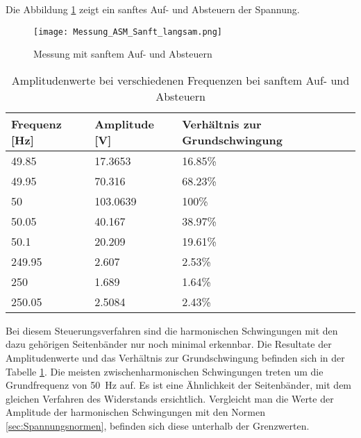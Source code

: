 Die Abbildung \ref{fig:Mess_ASM_Sanft_langsam} zeigt ein sanftes Auf- und Absteuern der Spannung.

\begin{figure}[ht!]
	\centering
	\texttt{[image: Messung\_ASM\_Sanft\_langsam.png]}	
	\caption{Messung mit sanftem Auf- und Absteuern}\label{fig:Mess_ASM_Sanft_langsam}
\end{figure}


\begin{table}[ht!]
	\centering
	\begin{tabular}{|l|l|l|}
		\hline
		Frequenz {[}Hz{]} & Amplitude {[}V{]} & Verhältnis zur Grundschwingung \\ \hline
		49.85             & 17.3653           & 16.85\%                        \\ \hline
		49.95             & 70.316            & 68.23\%                        \\ \hline
		50                & 103.0639          & 100\%                          \\ \hline
		50.05             & 40.167            & 38.97\%                        \\ \hline
		50.1              & 20.209            & 19.61\%                        \\ \hline
		249.95            & 2.607             & 2.53\%                         \\ \hline
		250               & 1.689             & 1.64\%                         \\ \hline
		250.05            & 2.5084            & 2.43\%                         \\ \hline
	\end{tabular}
\caption{Amplitudenwerte bei verschiedenen Frequenzen bei sanftem Auf- und Absteuern}\label{tab:Mess_Spannung_ASM_AufAb_sanft}
\end{table}


Bei diesem Steuerungsverfahren sind die harmonischen Schwingungen mit den dazu gehörigen Seitenbänder nur noch minimal erkennbar. Die Resultate der Amplitudenwerte und das Verhältnis zur Grundschwingung befinden sich in der Tabelle \ref{tab:Mess_Spannung_ASM_AufAb_sanft}. Die meisten zwischenharmonischen Schwingungen treten um die Grundfrequenz von \SI{50}{Hz} auf. Es ist eine Ähnlichkeit der Seitenbänder, mit dem gleichen Verfahren des Widerstands ersichtlich. Vergleicht man die Werte der Amplitude der harmonischen Schwingungen mit den Normen \ref{sec:Spannungsnormen}, befinden sich diese unterhalb der Grenzwerten.




